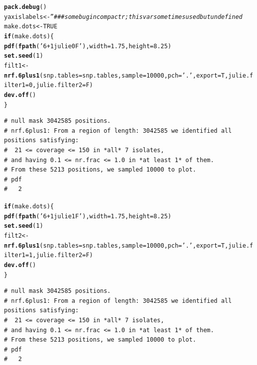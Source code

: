 \documentclass{article}\usepackage[]{graphicx}\usepackage[]{color}
\makeatletter
\newcommand{\hlnum}[1]{\textcolor[rgb]{0.686,0.059,0.569}{#1}}%
\newcommand{\hlstr}[1]{\textcolor[rgb]{0.192,0.494,0.8}{#1}}%
\newcommand{\hlcom}[1]{\textcolor[rgb]{0.678,0.584,0.686}{\textit{#1}}}%
\newcommand{\hlstd}[1]{\textcolor[rgb]{0.345,0.345,0.345}{#1}}%
\newcommand{\hlkwa}[1]{\textcolor[rgb]{0.161,0.373,0.58}{\textbf{#1}}}%
\newcommand{\hlkwb}[1]{\textcolor[rgb]{0.69,0.353,0.396}{#1}}%
\newcommand{\hlkwc}[1]{\textcolor[rgb]{0.333,0.667,0.333}{#1}}%
\newcommand{\hlkwd}[1]{\textcolor[rgb]{0.737,0.353,0.396}{\textbf{#1}}}%
\newenvironment{kframe}{%
 \def\at@end@of@kframe{}%
 \ifinner\ifhmode%
  \def\at@end@of@kframe{\end{minipage}}%
  \begin{minipage}{\columnwidth}%
 \fi\fi%
 \def\FrameCommand##1{\hskip\@totalleftmargin \hskip-\fboxsep
 \colorbox{shadecolor}{##1}\hskip-\fboxsep
     \hskip-\linewidth \hskip-\@totalleftmargin \hskip\columnwidth}%
 \MakeFramed {\advance\hsize-\width
   \@totalleftmargin\z@ \linewidth\hsize
   \@setminipage}}%
 {\par\unskip\endMakeFramed%
 \at@end@of@kframe}
\newenvironment{knitrout}{}{} %
\makeatother
\begin{document}
\begin{knitrout}\footnotesize
{}\color{fgcolor}\begin{kframe}
\begin{alltt}
\hlkwd{pack.debug}\hlstd{()}
\hlstd{yaxislabels} \hlkwb{<-} \hlstr{''} \hlcom{### some bug in compactr; this var sometimes used but undefined}
\hlstd{make.dots} \hlkwb{<-} \hlnum{TRUE}
\hlkwa{if}\hlstd{(make.dots)\{}
  \hlkwd{pdf}\hlstd{(}\hlkwd{fpath}\hlstd{(}\hlstr{'6+1julie0F'}\hlstd{),} \hlkwc{width}\hlstd{=}\hlnum{1.75}\hlstd{,} \hlkwc{height}\hlstd{=}\hlnum{8.25}\hlstd{)}
  \hlkwd{set.seed}\hlstd{(}\hlnum{1}\hlstd{)}
  \hlstd{filt1} \hlkwb{<-} \hlkwd{nrf.6plus1}\hlstd{(}\hlkwc{snp.tables}\hlstd{=snp.tables,}\hlkwc{sample}\hlstd{=}\hlnum{10000}\hlstd{,}\hlkwc{pch}\hlstd{=}\hlstr{'.'}\hlstd{,}\hlkwc{export}\hlstd{=T,}\hlkwc{julie.filter1}\hlstd{=}\hlnum{0}\hlstd{,}\hlkwc{julie.filter2}\hlstd{=F)}
  \hlkwd{dev.off}\hlstd{()}
\hlstd{\}}
\end{alltt}
\begin{verbatim}
# null mask 3042585 positions.
# nrf.6plus1: From a region of length: 3042585 we identified all positions satisfying: 
#  21 <= coverage <= 150 in *all* 7 isolates, 
# and having 0.1 <= nr.frac <= 1.0 in *at least 1* of them. 
# From these 5213 positions, we sampled 10000 to plot.
# pdf 
#   2
\end{verbatim}
\end{kframe}
\end{knitrout}
\begin{knitrout}\footnotesize
{}\color{fgcolor}\begin{kframe}
\begin{alltt}
\hlkwa{if}\hlstd{(make.dots)\{}
  \hlkwd{pdf}\hlstd{(}\hlkwd{fpath}\hlstd{(}\hlstr{'6+1julie1F'}\hlstd{),} \hlkwc{width}\hlstd{=}\hlnum{1.75}\hlstd{,} \hlkwc{height}\hlstd{=}\hlnum{8.25}\hlstd{)}
  \hlkwd{set.seed}\hlstd{(}\hlnum{1}\hlstd{)}
  \hlstd{filt2} \hlkwb{<-} \hlkwd{nrf.6plus1}\hlstd{(}\hlkwc{snp.tables}\hlstd{=snp.tables,}\hlkwc{sample}\hlstd{=}\hlnum{10000}\hlstd{,}\hlkwc{pch}\hlstd{=}\hlstr{'.'}\hlstd{,}\hlkwc{export}\hlstd{=T,}\hlkwc{julie.filter1}\hlstd{=}\hlnum{1}\hlstd{,}\hlkwc{julie.filter2}\hlstd{=F)}
  \hlkwd{dev.off}\hlstd{()}
\hlstd{\}}
\end{alltt}
\begin{verbatim}
# null mask 3042585 positions.
# nrf.6plus1: From a region of length: 3042585 we identified all positions satisfying: 
#  21 <= coverage <= 150 in *all* 7 isolates, 
# and having 0.1 <= nr.frac <= 1.0 in *at least 1* of them. 
# From these 5213 positions, we sampled 10000 to plot.
# pdf 
#   2
\end{verbatim}
\end{kframe}
\end{knitrout}
\end{document}
